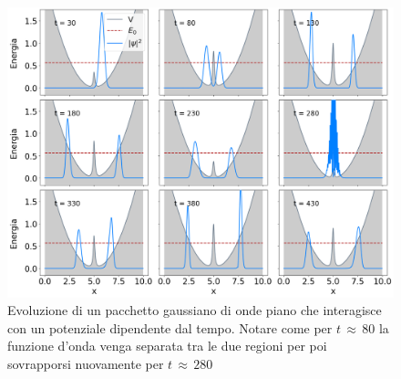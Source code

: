 \begin{figure}
   \centering
    \includegraphics[width = \textwidth]{immagini/t-dep.png}
    \caption{Evoluzione di un pacchetto gaussiano di onde piano che interagisce con un potenziale dipendente dal tempo. Notare come per $t \, \approx \, 80$ la funzione d'onda venga separata tra le due regioni per poi sovrapporsi nuovamente per  $t \, \approx \, 280$ }
    \label{fig:t-dep}
\end{figure}

   
   




